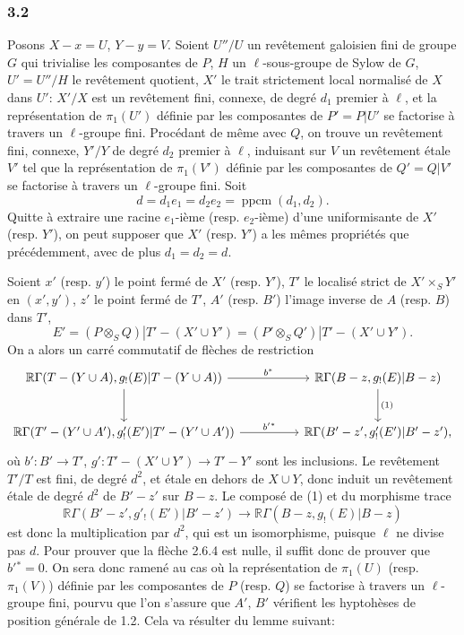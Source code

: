 \documentclass[11pt]{article}
\newcommand{\R}{\mathbb{R}}\newcommand{\RHomCore}{\mathbb{R}\mathrm{Hom}}
\providecommand{\R}{\mathrm R}
\begin{document}
\subsubsection*{3.2}
Posons $X-x=U$, $Y-y=V$. Soient $U''/U$ un revêtement galoisien fini de groupe $G$ qui trivialise les composantes de $P$, $H$ un $\ell$-sous-groupe de Sylow de $G$, $U'=U''/H$ le revêtement quotient, $X'$ le trait strictement local normalisé de $X$ dans $U'$: $X'/X$ est un revêtement fini, connexe, de degré $d_1$ premier à $\ell$, et la représentation de $\pi_1(U')$ définie par les composantes de $P'=P|U'$ se factorise à travers un $\ell$-groupe fini. Procédant de même avec $Q$, on trouve un revêtement fini, connexe, $Y'/Y$ de degré $d_2$ premier à $\ell$, induisant sur $V$ un revêtement étale $V'$ tel que la représentation de $\pi_1(V')$ définie par les composantes de $Q'=Q|V'$ se factorise à travers un $\ell$-groupe fini. Soit
\[
d=d_1e_1=d_2e_2=\operatorname{ppcm}(d_1,d_2).
\]
Quitte à extraire une racine $e_1$-ième (resp. $e_2$-ième) d'une uniformisante de $X'$ (resp. $Y'$), on peut supposer que $X'$ (resp. $Y'$) a les mêmes propriétés que précédemment, avec de plus $d_1=d_2=d$.

Soient $x'$ (resp. $y'$) le point fermé de $X'$ (resp. $Y'$), $T'$ le localisé strict de $X'\times_S Y'$ en $(x',y')$, $z'$ le point fermé de $T'$, $A'$ (resp. $B'$) l'image inverse de $A$ (resp. $B$) dans $T'$,
\[
E'=(P\otimes_S Q)|T'-(X'\cup Y')
   =(P'\otimes_S Q')|T'-(X'\cup Y').
\]
On a alors un carré commutatif de flèches de restriction
\[
\begin{tikzcd}[column sep=huge,row sep=large]
\R\Gamma(T-(Y\cup A),g_!(E)|T-(Y\cup A))
 \arrow[r,"b^*"] \arrow[d]
&
\R\Gamma(B-z,g_!(E)|B-z) \arrow[d,"(1)"]\\
\R\Gamma(T'-(Y'\cup A'),g'_!(E')|T'-(Y'\cup A'))
 \arrow[r,"b'{}^*"]
&
\R\Gamma(B'-z',g'_!(E')|B'-z') ,
\end{tikzcd}
\]
où $b':B'\to T'$, $g':T'-(X'\cup Y')\to T'-Y'$
sont les inclusions. Le revêtement $T'/T$ est fini, de degré $d^2$, et étale en dehors de $X\cup Y$, donc induit un revêtement étale de degré $d^2$ de $B'-z'$ sur $B-z$. Le composé de (1) et du morphisme trace
\[
\R\Gamma(B'-z',g'_!(E')|B'-z')
 \longrightarrow
\R\Gamma(B-z,g_!(E)|B-z)
\]
est donc la multiplication par $d^2$, qui est un isomorphisme, puisque $\ell$ ne divise pas $d$. Pour prouver que la flèche 2.6.4 est nulle, il suffit donc de prouver que $b'{}^*=0$. On sera donc ramené au cas où la représentation de $\pi_1(U)$ (resp. $\pi_1(V)$) définie par les composantes de $P$ (resp. $Q$) se factorise à travers un $\ell$-groupe fini, pourvu que l'on s'assure que $A'$, $B'$ vérifient les hyptohèses de position générale de 1.2. Cela va résulter du lemme suivant:
\end{document}
